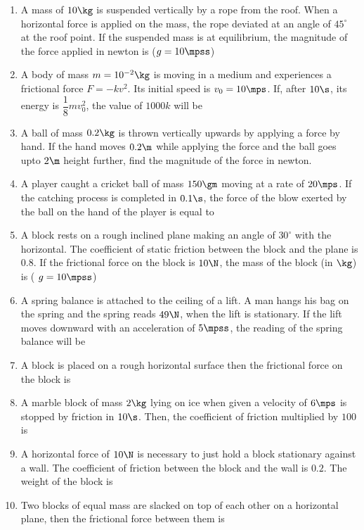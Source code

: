 \documentclass{article}
\def\ansit#1{\textcolor{red!95}{\quad}}
\begin{document}
\begin{enumerate}
\item A mass of $10 \kg$ is suspended vertically by a rope from the roof. When a horizontal force is applied on the mass, the rope deviated at an angle of $45^\circ$ at the roof point. If the suspended mass is at equilibrium, the magnitude of the force applied in newton is ($g=10\mpss$)\ansit{100}

\item A body of mass $m=10^{-2}\kg$ is moving in a medium and experiences a frictional force $F = -kv^2$. Its initial speed is $v_0 =10\mps$. If,
after $10\s$, its  energy is $\dfrac{1}{8}mv_0^2$, the value of $1000k$ will be \ansit{1}

\item A ball of mass $0.2 \kg$ is thrown vertically upwards by applying a force by hand. If the hand moves $0.2 \m$ while applying the force and the ball goes upto $2 \m$ height further, find the magnitude of the force in newton. \ansit{22}

\item A player caught a cricket ball of mass $150 \gm$ moving at a rate of $20 \mps$. If the catching process is completed in $0.1 \s$, the force of the blow exerted by the ball on the hand of the player is equal to \ansit{30}

\item A block rests on a rough inclined plane making an angle of $30^\circ$ with the horizontal. The coefficient of static friction between the block and the plane is $0.8$. If the frictional force on the block is $10 \N$, the mass of the block (in $\kg$) is ( $g = 10 \mpss$)\ansit{2}

\item A spring balance is attached to the ceiling of a lift. A man hangs his bag on the spring and the spring reads $49 \N$, when the lift is stationary. If the lift moves downward with an acceleration of $5 \mpss$, the reading of the spring balance will be \ansit{24}

\item A block is placed on a rough horizontal surface then the frictional force on the block is \ansit{0}

\item A marble block of mass $2 \kg$ lying on ice when given a velocity of $6 \mps$ is stopped by friction in $10 \s$. Then, the coefficient of friction multiplied by $100$ is \ansit{6}

\item A horizontal force of $10 \N$ is necessary to just
hold a block stationary against a wall. The
coefficient of friction between the block and
the wall is $0.2$. The weight of the block is \ansit{2}

\item Two blocks of equal mass are slacked on top of each other on a horizontal plane, then the frictional force between them is \ansit{0}
\end{enumerate}
\end{document}
